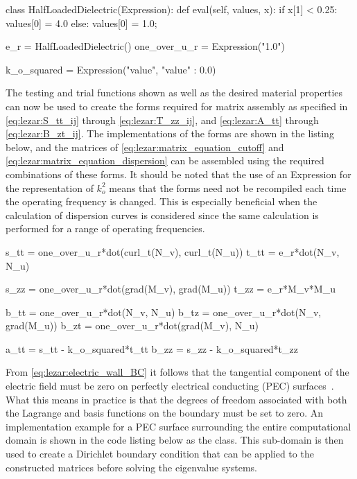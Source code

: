\begin{python}
class HalfLoadedDielectric(Expression):
    def eval(self, values, x):
        if x[1] < 0.25:
            values[0] = 4.0
        else:
            values[0] = 1.0;

e_r = HalfLoadedDielectric()
one_over_u_r = Expression("1.0")

k_o_squared = Expression("value", {"value" : 0.0})
\end{python}

The testing and trial functions shown as well as the
desired material properties can now be used to create
the forms required for matrix assembly as specified in
\eqref{eq:lezar:S_tt_ij} through \eqref{eq:lezar:T_zz_ij}, and
\eqref{eq:lezar:A_tt} through \eqref{eq:lezar:B_zt_ij}. The
implementations of the forms are shown in the listing below,
and the matrices of \eqref{eq:lezar:matrix_equation_cutoff} and
\eqref{eq:lezar:matrix_equation_dispersion} can be assembled using the
required combinations of these forms. It should be noted that the use of
an Expression for the representation of $k_o^2$ means that the forms need
not be recompiled each time the operating frequency is changed. This
is especially beneficial when the calculation of dispersion curves
is considered since the same calculation is performed for a range of
operating frequencies.

\begin{python}
s_tt = one_over_u_r*dot(curl_t(N_v), curl_t(N_u))
t_tt = e_r*dot(N_v, N_u)

s_zz = one_over_u_r*dot(grad(M_v), grad(M_u))
t_zz = e_r*M_v*M_u

b_tt = one_over_u_r*dot(N_v, N_u)
b_tz = one_over_u_r*dot(N_v, grad(M_u))
b_zt = one_over_u_r*dot(grad(M_v), N_u)

a_tt = s_tt - k_o_squared*t_tt
b_zz = s_zz - k_o_squared*t_zz
\end{python}

From \eqref{eq:lezar:electric_wall_BC} it follows that the tangential
component of the electric field must be zero on perfectly electrical
conducting (PEC) surfaces~\citep{Smith1997}. What this means in
practice is that the degrees of freedom associated with both the
Lagrange and \nedelec{} basis functions on the boundary must be set
to zero. An implementation example for a PEC surface surrounding the
entire computational domain is shown in the code listing below as the
 class. This sub-domain is then used to create a
Dirichlet boundary condition that can be applied to the constructed
matrices before solving the eigenvalue systems.

